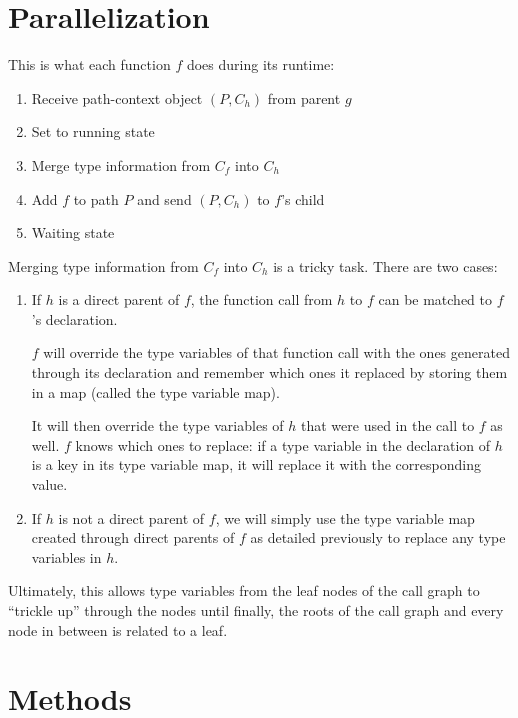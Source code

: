 \documentclass{acm_proc_article-sp}
\begin{document}

\section{Parallelization}

This is what each function $f$ does during its runtime:
\begin{enumerate}[noitemsep]
	\item Receive path-context object $(P, C_h)$ from parent $g$
	\item Set to running state
	\item Merge type information from $C_f$ into $C_h$
	\item Add $f$ to path $P$ and send $(P, C_h)$ to $f$'s child
	\item Waiting state
\end{enumerate}

Merging type information from $C_f$ into $C_h$ is a tricky task. There are two
cases:
\begin{enumerate}
	\item If $h$ is a direct parent of $f$, the function call from $h$ to $f$
		can be matched to $f$'s declaration.

		$f$ will override the type
		variables of that function call with the ones generated through its
		declaration and remember which ones it replaced by storing them in a
		map (called the type variable map).

		It will then override the type variables of $h$ that were used in the
		call to $f$ as well. $f$ knows which ones to replace: if a type
		variable in the declaration of $h$ is a key in its type variable map,
		it will replace it with the corresponding value.
	\item If $h$ is not a direct parent of $f$, we will simply use the type
		variable map created through direct parents of $f$ as detailed
		previously to replace any type variables in $h$.
\end{enumerate}

Ultimately, this allows type variables from the leaf nodes of the call graph to
``trickle up'' through the nodes until finally, the roots of the call graph and
every node in between is related to a leaf.


\section{Methods}

\end{document}
